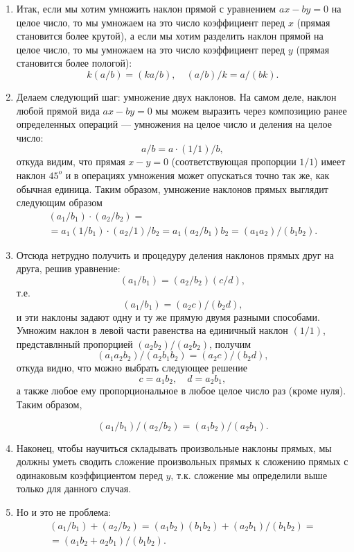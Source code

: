 \begin{enumerate}
\item Итак, если мы хотим умножить наклон прямой с уравнением $ax-by=0$ на целое число, то мы умножаем на это число коэффициент перед $x$ (прямая становится более крутой), а если мы хотим разделить наклон прямой на целое число, то мы умножаем на это число коэффициент перед $y$ (прямая становится более пологой):
$$
k(a/b)=(ka/b),\quad (a/b)/k = a/(bk).
$$






\item Делаем следующий шаг: умножение двух наклонов. На самом деле, наклон любой прямой вида $ax-by=0$ мы можем выразить через композицию ранее определенных операций --- умножения на целое число и деления на целое число:
$$
a/b = a\cdot(1/1)/b,
$$
откуда видим, что прямая $x-y=0$ (соответствующая пропорции $1/1$) имеет наклон $45^o$ и в операциях умножения может опускаться точно так же, как обычная единица. Таким образом, умножение наклонов прямых выглядит следующим образом
\begin{gather*}
(a_1/b_1)\cdot(a_2/b_2) = \\
= a_1(1/b_1)\cdot (a_2/1)/b_2 = a_1(a_2/b_1)b_2 = (a_1a_2)/(b_1b_2).
\end{gather*}

\item Отсюда нетрудно получить и процедуру деления наклонов прямых друг на друга, решив уравнение:
$$
(a_1/b_1) = (a_2/b_2)(c/d),
$$
т.е.
$$
(a_1/b_1) = (a_2c)/(b_2d),
$$
и эти наклоны задают одну и ту же прямую двумя разными способами. Умножим наклон в левой части равенства на единичный наклон $(1/1)$, представлнный пропорцией $(a_2b_2)/(a_2b_2)$, получим
$$
(a_1a_2b_2)/(a_2b_1b_2) = (a_2c)/(b_2d),
$$
откуда видно, что можно выбрать следующее решение
$$
c = a_1b_2,\quad d = a_2b_1,
$$
а также любое ему пропорциональное в любое целое число раз (кроме нуля). Таким образом,

$$
(a_1/b_1)/(a_2/b_2) = (a_1b_2)/(a_2b_1).
$$

\item Наконец, чтобы научиться складывать произвольные наклоны прямых, мы должны уметь сводить сложение произвольных прямых к сложению прямых с одинаковым коэффициентом перед $y$, т.к. сложение мы определили выше только для данного случая.
\item Но и это не проблема:
\begin{gather*}
(a_1/b_1)+(a_2/b_2) = (a_1b_2)(b_1b_2) + (a_2b_1)/(b_1b_2) = \\
= (a_1b_2+a_2b_1)/(b_1b_2).
\end{gather*}


\end{enumerate}
